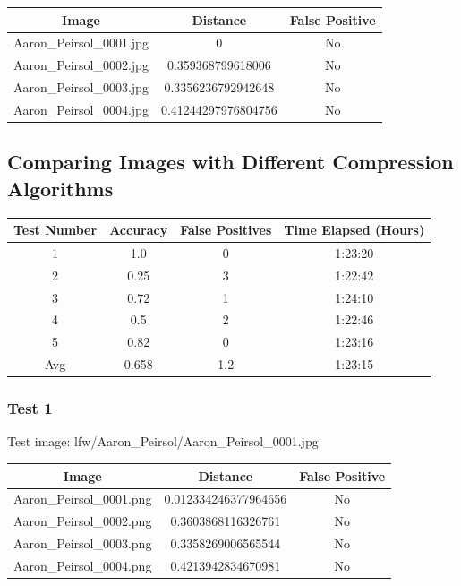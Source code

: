 \documentclass[12pt]{article}
\begin{document}
\begin{center}
\begin{tabular}{ccc}
Image & Distance & False Positive \\
\hline
Aaron\_Peirsol\_0001.jpg & 0 & No \\
Aaron\_Peirsol\_0002.jpg & 0.359368799618006 & No \\
Aaron\_Peirsol\_0003.jpg & 0.3356236792942648 & No \\
Aaron\_Peirsol\_0004.jpg & 0.41244297976804756 & No \\
\end{tabular}
\end{center}

\newpage
\subsection{Comparing Images with Different Compression Algorithms}
\begin{center}
\begin{tabular}{cccc}
Test Number & Accuracy & False Positives & Time Elapsed (Hours) \\
\hline
1 & 1.0 & 0 & 1:23:20\\
2 & 0.25 & 3 & 1:22:42\\
3 & 0.72 & 1 & 1:24:10\\
4 & 0.5 & 2 & 1:22:46\\
5 & 0.82 & 0 & 1:23:16\\
Avg & 0.658 & 1.2 & 1:23:15 \\ 
\end{tabular}
\end{center}

\subsubsection{Test 1}
Test image: lfw/Aaron\_Peirsol/Aaron\_Peirsol\_0001.jpg

\begin{center}
\begin{tabular}{ccc}
Image & Distance & False Positive \\
\hline
Aaron\_Peirsol\_0001.png & 0.012334246377964656 & No \\
Aaron\_Peirsol\_0002.png & 0.3603868116326761 & No \\
Aaron\_Peirsol\_0003.png & 0.3358269006565544 & No \\
Aaron\_Peirsol\_0004.png & 0.4213942834670981 & No \\
\end{tabular}
\end{center}
\end{document}
